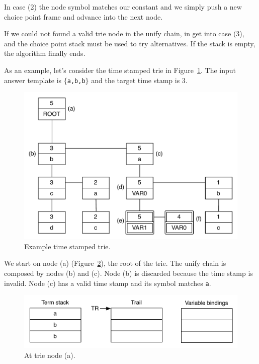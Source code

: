 In case (2) the node symbol matches our constant and we simply push a new choice point frame and advance into the next node.

If we could not found a valid trie node in the unify chain, in get into case (3), and the choice point
stack must be used to try alternatives. If the stack is empty, the algorithm finally ends.

As an example, let's consider the time stamped trie in
Figure~\ref{fig:collect_example_1}. The input answer template is $\{$\texttt{a,b,b}$\}$ and the target time stamp is 3.

\begin{figure}[H]
  \centering
    \includegraphics[scale=0.6]{collect_example_1.pdf}
  \caption{Example time stamped trie.}
  \label{fig:collect_example_1}
\end{figure}

We start on node (a) (Figure~\ref{fig:collect_ex1}), the root of the trie. The unify chain
is composed by nodes (b) and (c). Node (b) is discarded because the time stamp is invalid.
Node (c) has a valid time stamp and its symbol matches \texttt{a}.

\begin{figure}[H]
  \centering
    \includegraphics[scale=0.5]{collect_ex1.pdf}
  \caption{At trie node (a).}
  \label{fig:collect_ex1}
\end{figure}


